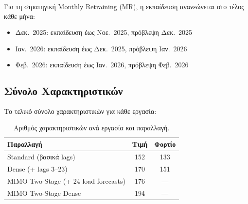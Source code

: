 Για τη στρατηγική Monthly Retraining (MR), η εκπαίδευση ανανεώνεται στο τέλος κάθε μήνα:
\begin{itemize}
    \item Δεκ.\ 2025: εκπαίδευση έως Νοε.\ 2025, πρόβλεψη Δεκ.\ 2025
    \item Ιαν.\ 2026: εκπαίδευση έως Δεκ.\ 2025, πρόβλεψη Ιαν.\ 2026
    \item Φεβ.\ 2026: εκπαίδευση έως Ιαν.\ 2026, πρόβλεψη Φεβ.\ 2026
\end{itemize}

\subsection{Σύνολο Χαρακτηριστικών}

Το τελικό σύνολο χαρακτηριστικών για κάθε εργασία:

\begin{table}[H]
\centering
\caption{Αριθμός χαρακτηριστικών ανά εργασία και παραλλαγή.}
\label{tab:feature_counts}
\begin{tabular}{lcc}
\toprule
\textbf{Παραλλαγή} & \textbf{Τιμή} & \textbf{Φορτίο} \\
\midrule
Standard (βασικά lags) & 152 & 133 \\
Dense (+ lags 3--23) & 170 & 151 \\
MIMO Two-Stage (+ 24 load forecasts) & 176 & --- \\
MIMO Two-Stage Dense & 194 & --- \\
\bottomrule
\end{tabular}
\end{table}
